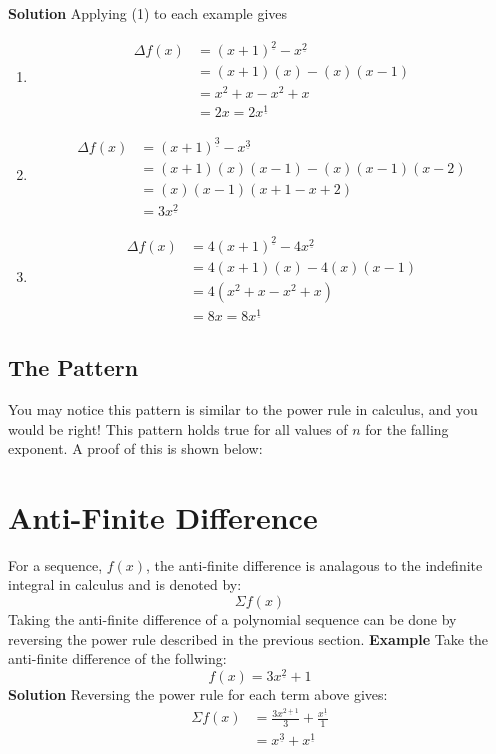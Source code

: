 \textbf{Solution}
Applying (1) to each example gives
\begin{enumerate}
    \item \begin{align*}
        \Delta f(x) & = (x+1)^{\underline{2}} - x^{\underline{2}} \\
        & = (x+1)(x) - (x)(x-1) \\
        & = x^2 + x - x^2 + x \\
        & = 2x = 2x^{\underline{1}}
    \end{align*}

    \item \begin{align*}
        \Delta f(x) & = (x+1)^{\underline{3}} - x^{\underline{3}} \\
        & = (x+1)(x)(x-1) - (x)(x-1)(x-2) \\
        & = (x)(x-1)(x+1-x+2) \\
        & = 3x^{\underline{2}} 
    \end{align*}

    \item \begin{align*}
        \Delta f(x) & = 4(x+1)^{\underline{2}} - 4x^{\underline{2}} \\
        & = 4(x+1)(x) - 4(x)(x-1) \\
        & = 4(x^2 + x - x^2 + x) \\
        & = 8x = 8x^{\underline{1}}
    \end{align*}
\end{enumerate}

\subsection{The Pattern}
You may notice this pattern is similar to the power rule in calculus, and you would be right! This pattern holds true for all values of \(n\) for the falling exponent. 
A proof of this is shown below:

\section{Anti-Finite Difference}
For a sequence, \(f(x)\), the anti-finite difference is analagous to the indefinite integral in calculus and is denoted by: 
\[\Sigma f(x)\]
Taking the anti-finite difference of a polynomial sequence can be done by reversing the power rule described in the previous section. 
\textbf{Example} 
Take the anti-finite difference of the follwing: \[f(x) = 3x^{\underline{2}} + 1\]
\textbf{Solution}
Reversing the power rule for each term above gives: 
\begin{align*}
    \Sigma f(x) & = \frac{3x^{\underline{2+1}}}{3} + \frac{x^{\underline{1}}}{1} \\
    & = x^{\underline{3}} + x^{\underline{1}}
\end{align*}

